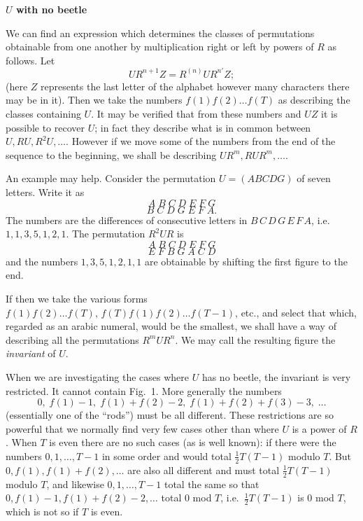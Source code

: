 \documentclass[12pt]{article}
\begin{document}
\noindent
{\bf $U$ with no beetle}

\medskip

We can find an expression which determines the classes of permutations obtainable from one another by multiplication right or left by powers of $R$ as follows. Let
\[
U R^{n+1} Z = R^{(n)} U R^{n'} Z;
\]
(here $Z$ represents the last letter of the alphabet however many characters there may be in it). Then we take the numbers $f(1) f(2) \dots f(T)$ as describing the classes containing $U$. It may be verified that from these numbers and $UZ$ it is possible to recover $U$; in fact they describe what is in common between $U, RU, R^2 U, \dots$. However if we move some of the numbers from the end of the sequence to the beginning, we shall be describing $UR^m, RUR^m, \dots$.

\medskip

An example may help. Consider the permutation $U = (ABCDG)$ of seven letters. Write it as
\[
A \; B \; C \; D \; E \; F \; G
\]
\[
B \; C \; D \; G \; E \; F \; A.
\]
The numbers are the differences of consecutive letters in $B\,C\,D\,G\,E\,F\,A$, i.e.\ $1,1,3,5,1,2,1$. The permutation $R^2 U R$ is
\[
A \; B \; C \; D \; E \; F \; G
\]
\[
E \; F \; B \; G \; A \; C \; D
\]
and the numbers $1,3,5,1,2,1,1$ are obtainable by shifting the first figure to the end.

\medskip

If then we take the various forms $f(1) f(2) \dots f(T), \, f(T) f(1) f(2) \dots f(T-1)$, etc., and select that which, regarded as an arabic numeral, would be the smallest, we shall have a way of describing all the permutations $R^m U R^n$. We may call the resulting figure the {\em invariant} of $U$.

\bigskip

When we are investigating the cases where $U$ has no beetle, the invariant is very restricted. It cannot contain Fig.~1. More generally the numbers
\[
0,\; f(1)-1,\; f(1) + f(2) - 2,\; f(1) + f(2) + f(3) - 3,\; \dots
\]
(essentially one of the ``rods'') must be all different. These restrictions are so powerful that we normally find very few cases other than where $U$ is a power of $R$. When $T$ is even there are no such cases (as is well known): if there were the numbers $0,1,\dots,T-1$ in some order and would total $\tfrac12 T(T-1)$ modulo $T$. But $0, f(1), f(1) + f(2), \dots$ are also all different and must total $\tfrac12 T(T-1)$ modulo $T$, and likewise $0,1,\dots, T-1$ total the same so that $0, f(1)-1, f(1)+f(2)-2, \dots$ total 0 mod $T$, i.e.\ $\tfrac12 T(T-1)$ is 0 mod $T$, which is not so if $T$ is even.
\end{document}
